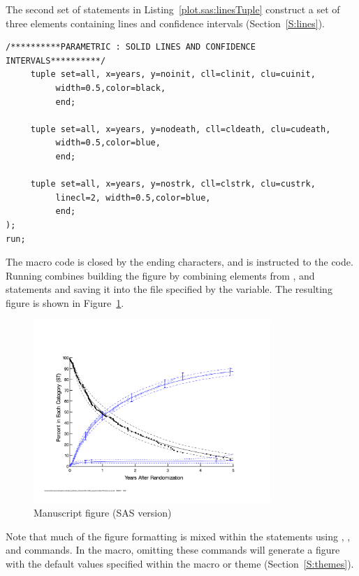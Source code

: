 \documentclass[nojss]{jss}\usepackage[]{graphicx}\usepackage[]{color}
\begin{document}
The second set of  statements in Listing~\ref{plot.sas:linesTuple} construct a set of three elements containing lines and confidence intervals (Section~\ref{S:lines}).
\begin{lstlisting}[float,floatplacement=!htpb, caption={plot.sas commands: lines tuple statements.}, label={plot.sas:linesTuple}]
     /**********PARAMETRIC : SOLID LINES AND CONFIDENCE INTERVALS**********/      
     tuple set=all, x=years, y=noinit, cll=clinit, clu=cuinit,
          width=0.5,color=black, 
          end;
     
     tuple set=all, x=years, y=nodeath, cll=cldeath, clu=cudeath,
          width=0.5,color=blue, 
          end;

     tuple set=all, x=years, y=nostrk, cll=clstrk, clu=custrk,
          linecl=2, width=0.5,color=blue, 
          end;
);
run;
\end{lstlisting}

The  macro code is closed by the ending \code{);} characters, and  is instructed to  the code. Running combines building the figure by combining elements from ,  and  statements and saving it into the file specified by the  variable. The resulting figure is shown in Figure~\ref{F:sasManuscript}.

\begin{figure}[!htpb]
\centering
\includegraphics[width=0.8\textwidth]{../inst/ceStatesST.pdf}
\caption{Manuscript figure (SAS version)}
\label{F:sasManuscript}
\end{figure}

Note that much of the figure formatting is mixed within the  statements using , ,  and  commands. In the  macro, omitting these commands will generate a figure with the default values specified within the  macro or  theme (Section~\ref{S:themes}).
\end{document}
